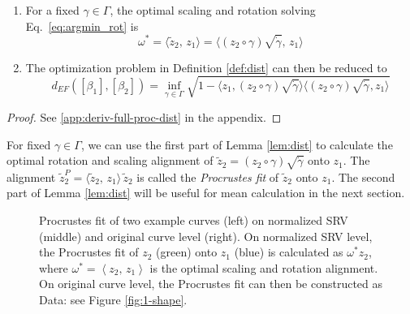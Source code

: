 \begin{lemma}
  \label{lem:dist}
  \begin{enumerate}[label=\emph{\roman*.)}]
    \item For a fixed $\gamma \in \Gamma$, the optimal scaling and rotation solving Eq.\ \ref{eq:argmin_rot} is 
      $$ \omega^* = \langle \widetilde z_2,\, z_1 \rangle = \langle (z_2 \circ \gamma) \sqrt{\dot\gamma},\, z_1 \rangle$$
    \item The optimization problem in Definition \ref{def:dist} can then be reduced to
      $$ d_{EF}([\beta_1],[\beta_2]) = \inf_{\gamma \in \Gamma} \sqrt{ 1 - \langle z_1, (z_2 \circ \gamma) \sqrt{\dot\gamma} \rangle \langle (z_2 \circ \gamma) \sqrt{\dot\gamma}, z_1 \rangle }$$
  \end{enumerate}
  \begin{proof}
  See \ref{app:deriv-full-proc-dist} in the appendix.
  \end{proof}
\end{lemma}
\begin{remark}
  For fixed $\gamma \in \Gamma$, we can use the first part of Lemma \ref{lem:dist} to calculate the optimal rotation and scaling alignment of $\widetilde z_2 = (z_2 \circ \gamma) \sqrt{\dot\gamma}$ onto $z_1$. The alignment $\widetilde z_2^P = \langle \widetilde z_2,\, z_1 \rangle \, \widetilde z_2$ is called the \emph{Procrustes fit} of $\widetilde z_2$ onto $z_1$. The second part of Lemma \ref{lem:dist} will be useful for mean calculation in the next section.
\end{remark}

\begin{figure}
  \centering
  \begin{subfigure}{.32\textwidth}
    \centering
  \end{subfigure}\hfill%
  \begin{subfigure}{.32\textwidth}
    \centering
  \end{subfigure}\hfill%
  \begin{subfigure}{.32\textwidth}
    \centering
  \end{subfigure}
  \caption{
    Procrustes fit of two example curves (left) on normalized SRV (middle) and original curve level (right).
    On normalized SRV level, the Procrustes fit of $z_2$ (green) onto $z_1$ (blue) is calculated as $\omega^* z_2$, where $\omega^* = \left\langle z_2,\, z_1 \right\rangle$ is the optimal scaling and rotation alignment.
    On original curve level, the Procrustes fit can then be constructed as 
    Data: see Figure \ref{fig:1-shape}.}
  \label{fig:2-pfit}
\end{figure}

